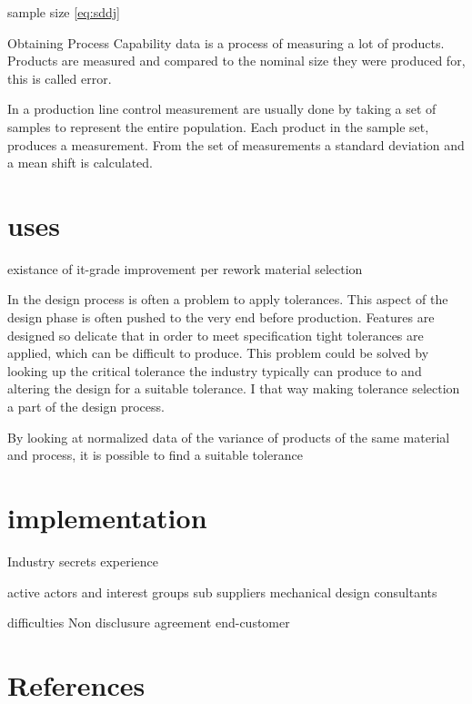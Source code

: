 \documentclass[aip,amsmath, reprint, author-year]{revtex4-1}
\begin{document}
sample size  \ref{eq:sddj}




Obtaining Process Capability data is a process of measuring a lot of products.
Products are measured and compared to the nominal size they were produced for, this is called error.

In a production line control measurement are usually done by taking a set of samples to represent the entire population. Each product in the sample set, produces a measurement. From the set of measurements a standard deviation and a mean shift is calculated.

\section{uses}
existance of it-grade
improvement per rework
material selection



In the design process is often a problem to apply tolerances. This aspect of the design phase is often pushed to the very end before production. Features are designed so delicate that in order to meet specification tight tolerances are applied, which can be difficult to produce.
This problem could be solved by looking up the critical tolerance the industry typically can produce to and altering the design for a suitable tolerance.  I that way making tolerance selection a part of the design process.

By looking at normalized data of the variance of products of the same material and process, it is possible to find a suitable tolerance

\section{implementation}




Industry secrets
	experience
	
	
active actors and interest groups
	sub suppliers 
	mechanical design consultants
	

difficulties
	Non disclusure agreement
	end-customer
	

\section*{References}

\end{document}
